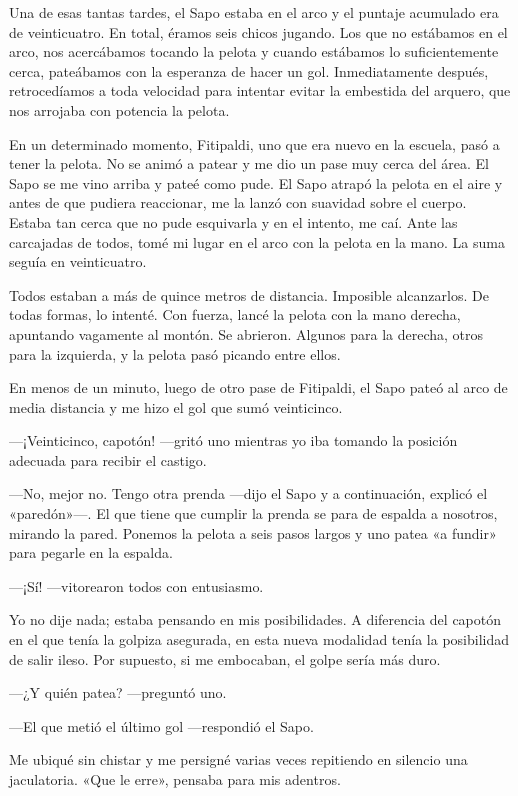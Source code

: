 \documentclass[11pt,twoside,openright]{book}
\begin{document}
 Una de esas tantas tardes, el Sapo estaba en el arco y el puntaje acumulado era
 de veinticuatro. En total, éramos seis chicos jugando. Los que no estábamos en
 el arco, nos acercábamos tocando la pelota y cuando estábamos lo
 suficientemente cerca, pateábamos con la esperanza de hacer un gol.
 Inmediatamente después, retrocedíamos a toda velocidad para intentar evitar la
 embestida del arquero, que nos arrojaba con potencia la pelota.
 
 En un determinado momento, Fitipaldi, uno que era nuevo en la escuela, pasó a
 tener la pelota. No se animó a patear y me dio un pase muy cerca del área. El
 Sapo se me vino arriba y pateé como pude. El Sapo atrapó la pelota en el aire y
 antes de que pudiera reaccionar, me la lanzó con suavidad sobre el cuerpo.
 Estaba tan cerca que no pude esquivarla y en el intento, me caí. Ante las
 carcajadas de todos, tomé mi lugar en el arco con la pelota en la mano. La suma
 seguía en veinticuatro.
 
 Todos estaban a más de quince metros de distancia. Imposible alcanzarlos. De
 todas formas, lo intenté. Con fuerza, lancé la pelota con la mano derecha,
 apuntando vagamente al montón. Se abrieron. Algunos para la derecha, otros para
 la izquierda, y la pelota pasó picando entre ellos.
 
 En menos de un minuto, luego de otro pase de Fitipaldi, el Sapo pateó al arco
 de media distancia y me hizo el gol que sumó veinticinco.
 
 ---¡Veinticinco, capotón! ---gritó uno mientras yo iba tomando la posición
 adecuada para recibir el castigo.
 
 ---No, mejor no. Tengo otra prenda ---dijo el Sapo y a continuación, explicó el
 «paredón»---. El que tiene que cumplir la prenda se para de espalda a nosotros,
 mirando la pared. Ponemos la pelota a seis pasos largos y uno patea «a fundir»
 para pegarle en la espalda.
 
 ---¡Sí! ---vitorearon todos con entusiasmo.
 
 Yo no dije nada; estaba pensando en mis posibilidades. A diferencia del capotón
 en el que tenía la golpiza asegurada, en esta nueva modalidad tenía la
 posibilidad de salir ileso. Por supuesto, si me embocaban, el golpe sería más
 duro.
 
 ---¿Y quién patea? ---preguntó uno.
 
 ---El que metió el último gol ---respondió el Sapo.
 
 Me ubiqué sin chistar y me persigné varias veces repitiendo en silencio una
 jaculatoria. «Que le erre», pensaba para mis adentros.
 
\end{document}
